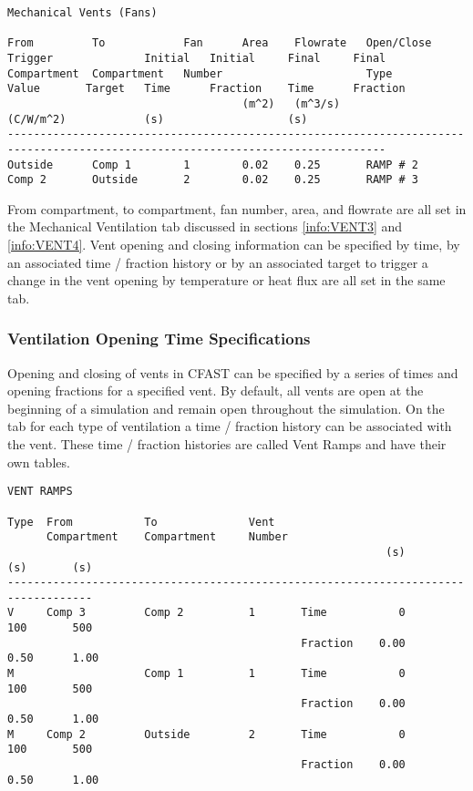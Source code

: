\begin{lstlisting}[basicstyle=\tiny]
Mechanical Vents (Fans)

From         To            Fan      Area    Flowrate   Open/Close  Trigger              Initial   Initial     Final     Final
Compartment  Compartment   Number                      Type        Value       Target   Time      Fraction    Time      Fraction
                                    (m^2)   (m^3/s)                (C/W/m^2)            (s)                   (s)
--------------------------------------------------------------------------------------------------------------------------------
Outside      Comp 1        1        0.02    0.25       RAMP # 2
Comp 2       Outside       2        0.02    0.25       RAMP # 3
\end{lstlisting}
From compartment, to compartment, fan number, area, and flowrate are all set in the Mechanical Ventilation tab discussed in sections \ref{info:VENT3} and \ref{info:VENT4}.  Vent opening and closing information can be specified by time, by an associated time / fraction history or by an associated target to trigger a change in the vent opening by temperature or heat flux are all set in the same tab.


\subsubsection{Ventilation Opening Time Specifications}

Opening and closing of vents in CFAST can be specified by a series of times and opening fractions for a specified vent. By default, all vents are open at the beginning of a simulation and remain open throughout the simulation. On the tab for each type of ventilation a time / fraction history can be associated with the vent. These time / fraction histories are called Vent Ramps and have their own tables.
\begin{lstlisting}[basicstyle=\tiny]
VENT RAMPS

Type  From           To              Vent
      Compartment    Compartment     Number
                                                          (s)       (s)       (s)
-----------------------------------------------------------------------------------
V     Comp 3         Comp 2          1       Time           0       100       500
                                             Fraction    0.00      0.50      1.00
M                    Comp 1          1       Time           0       100       500
                                             Fraction    0.00      0.50      1.00
M     Comp 2         Outside         2       Time           0       100       500
                                             Fraction    0.00      0.50      1.00
\end{lstlisting}

